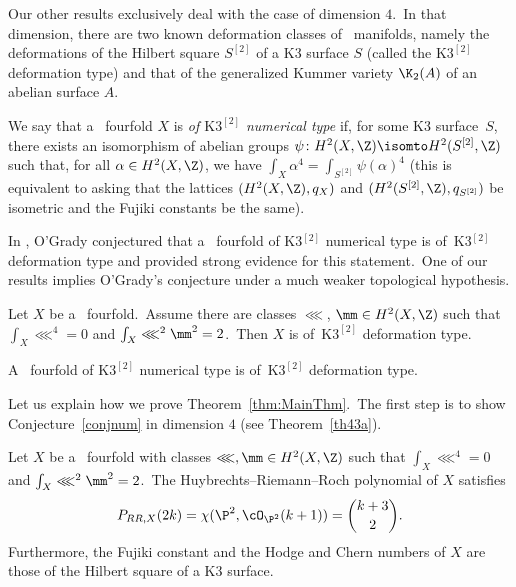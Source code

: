 Our other results exclusively deal with the case of dimension $4$.\
In that dimension, there are two known deformation classes of \hk\ manifolds, namely the deformations of the Hilbert square $S^{[2]}$ of  a K3 surface $S$ (called the $\mathrm{K3}^{[2]}$ deformation type) and that of the generalized Kummer variety $\K_2(A)$ of an abelian surface $A$.\

We say that a \hk\ fourfold $X$ is \emph{of $\mathrm{K3}^{[2]}$ numerical type} if, for some K3 surface~$S$, there exists an isomorphism of abelian groups $\psi\colon H^2(X,\Z)\isomto H^2(S^{[2]},\Z)$ such that, for all $\alpha\in H^2(X,\Z)$, we have $\int_X \alpha^4 = \int_{S^{[2]}} \psi(\alpha)^4$ (this is equivalent to asking that the lattices $(H^2(X,\Z),q_X) $ and $(H^2(S^{[2]},\Z),q_{S^{[2]}}) $ be isometric and the Fujiki constants be the same).\

In \cite{og1}, O'Grady  conjectured  that a \hk\ fourfold   of  K3$^{[2]}$ numerical type is of~K3$^{[2]}$ deformation type and provided strong evidence for this statement.\
One of our results implies O'Grady's conjecture under a much weaker  topological  hypothesis.

\begin{theo}\label{thm:MainThm}
Let $X$ be a \hk\ fourfold.\
Assume there are classes $\lll$, $\mm\in H^2(X,{\Z})$ such that $\int_X \lll^4=0$ and $\int_X\lll^2\mm^2=2$.\
Then $X$ is of~$\mathrm{K3}^{[2]}$ deformation type.
\end{theo}

\begin{coro}[O'Grady's conjecture]\label{cor:OGrady}
A \hk\ fourfold   of  $\mathrm{K3}^{[2]}$ numerical type  is of~$\mathrm{K3}^{[2]}$ deformation type.
\end{coro}

Let us explain  how we prove Theorem~\ref{thm:MainThm}.\
The first step   is to show Conjecture~\ref{conjnum} in dimension $4$ (see Theorem~\ref{th43a}).

\begin{theo}\label{thm:RRpoly}
Let $X$ be a \hk\ fourfold with classes $\lll,\mm\in H^2(X,\Z)$ such that $\int_X \lll^4=0$ and $\int_X\lll^2\mm^2=2$.\
The Huybrechts--Riemann--Roch polynomial of $X$ satisfies
\[
P_{RR,X}(2k)=\chi(\P^2,\cO_{\P^2}(k+1))=\binom{k+3}{2}.
\]
Furthermore, the Fujiki constant and the Hodge and Chern numbers of $X$ are those of the Hilbert square of a K3 surface.
\end{theo}

